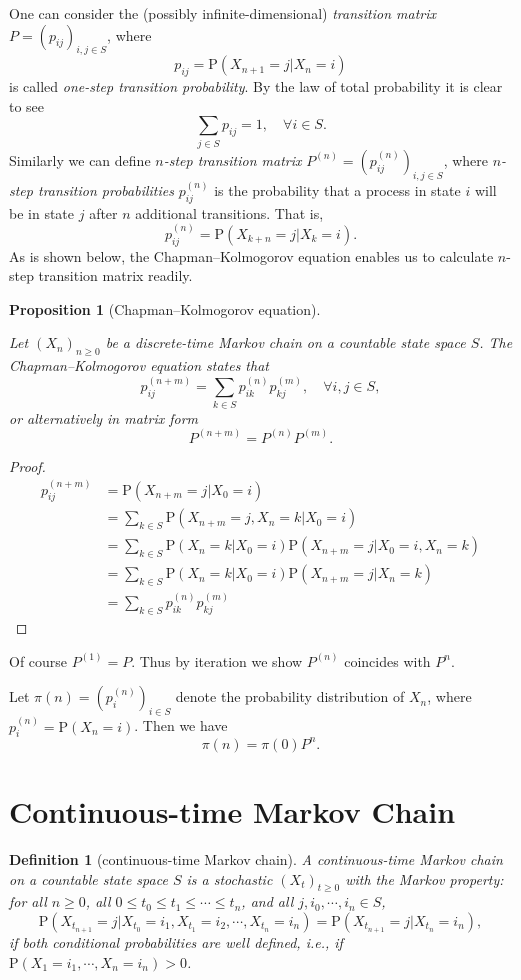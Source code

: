 \documentclass{report}
\newtheorem{definition}{Definition}[section]
\newtheorem{proposition}{Proposition}[section]
\theoremstyle{nonumberplain}
\newtheorem{proof}{Proof.}
\begin{document}
\noindent One can consider the (possibly infinite-dimensional) \emph{transition matrix}	$P=(p_{ij})_{i,j\in S}$, where
\[
p_{ij}=\mathrm{P}(X_{n+1}=j| X_{n}=i)
\]
is called \emph{one-step transition probability}. By the law of total probability it is clear to see 
\[
\sum_{j\in S}p_{ij}=1,\quad\forall i\in S.
\]
Similarly we can define \emph{$n$-step transition matrix} $P^{(n)}=\left(p^{(n)}_{ij}\right)_{i,j\in S}$, where \emph{$n$-step transition probabilities} $p^{(n)}_{ij}$ is the probability that a process in state $i$ will be in state $j$ after $n$ additional transitions. That is,
\[
p^{(n)}_{ij}=\mathrm{P}(X_{k+n}=j| X_{k}=i).
\]
As is shown below, the Chapman–Kolmogorov equation enables us to calculate $n$-step transition matrix readily.
\begin{proposition}[Chapman–Kolmogorov equation]\hypertarget{Proposition 4.1}{}
Let $(X_n)_{n\ge0}$ be a discrete-time Markov chain on a countable state space $S$. The \emph{Chapman–Kolmogorov equation} states that
\[
p^{(n+m)}_{ij}=\sum_{k\in S}p^{(n)}_{ik}p^{(m)}_{kj},\quad\forall i,j\in S,
\]
or alternatively in matrix form
\[
P^{(n+m)}=P^{(n)}P^{(m)}.
\]
\end{proposition}
\begin{proof}
	\[
	\begin{aligned}
		p^{(n+m)}_{ij}&=\mathrm{P}(X_{n+m}=j| X_{0}=i)\\
		&=\sum_{k\in S}\mathrm{P}(X_{n+m}=j,X_{n}=k| X_{0}=i)\\
		&=\sum_{k\in S}\mathrm{P}(X_{n}=k| X_{0}=i)\mathrm{P}(X_{n+m}=j| X_{0}=i,X_{n}=k)\\
		&=\sum_{k\in S}\mathrm{P}(X_{n}=k| X_{0}=i)\mathrm{P}(X_{n+m}=j| X_{n}=k)\\
		&=\sum_{k\in S}p^{(n)}_{ik}p^{(m)}_{kj}
	\end{aligned}
	\]
\end{proof}
\noindent Of course $P^{(1)}=P$. Thus by iteration we show $P^{(n)}$ coincides with $P^n$. 

\noindent Let $\pi(n)=\left(p_i^{(n)}\right)_{i\in S}$ denote the probability distribution of $X_n$, where $p_i^{(n)}=\mathrm{P}(X_n=i)$. Then we have
\[
\pi(n)=\pi(0)P^n.
\]

\section{Continuous-time Markov Chain}

\begin{definition}[continuous-time Markov chain]
	A \emph{continuous-time Markov chain} on a countable state space $S$ is a stochastic $(X_t)_{t\ge 0}$ with the Markov property: for all $ n\ge0$, all $0\le t_0\le t_1\le \cdots\le t_n$, and all	$j,i_0,\cdots,i_n\in S$,
	\[
	\mathrm{P}(X_{t_{n+1}}=j| X_{t_0}=i_{1},X_{t_1}=i_{2},\cdots,X_{t_n}=i_{n})=\mathrm{P}(X_{t_{n+1}}=j| X_{t_n}=i_{n}), 
	\] if both conditional probabilities are well defined, i.e., if $ 	\mathrm{P}(X_{1}=i_{1},\cdots ,X_{n}=i_{n})>0$.
\end{definition}
\end{document}
